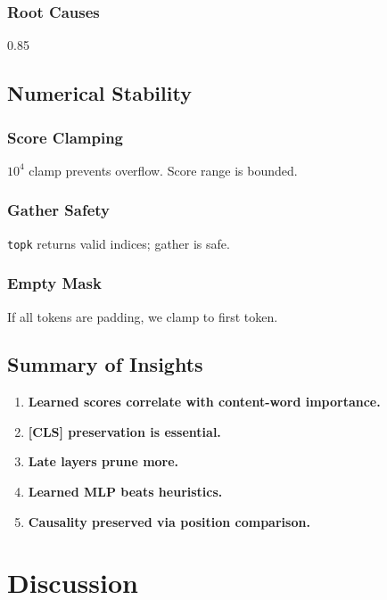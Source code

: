 {\subsubsection{Root Causes}

0.85

\subsection{Numerical Stability}

\subsubsection{Score Clamping}

$10^4$ clamp prevents overflow. Score range is bounded.

\subsubsection{Gather Safety}

\texttt{topk} returns valid indices; gather is safe.

\subsubsection{Empty Mask}

If all tokens are padding, we clamp to first token.

\subsection{Summary of Insights}

\begin{enumerate}
\item \textbf{Learned scores correlate with content-word importance.}
\item \textbf{[CLS] preservation is essential.}
\item \textbf{Late layers prune more.}
\item \textbf{Learned MLP beats heuristics.}
\item \textbf{Causality preserved via position comparison.}

\end{enumerate}



\section{Discussion}

}
